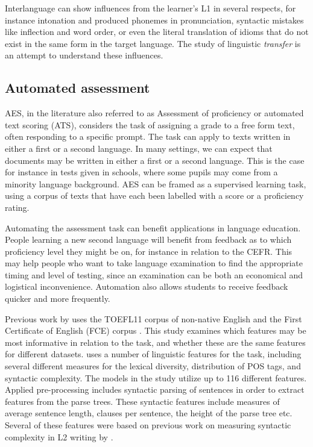 Interlanguage can show influences from the learner's L1 in several respects,
for instance intonation and produced phonemes in pronunciation, syntactic
mistakes like inflection and word order, or even the literal translation of
idioms that do not exist in the same form in the target language. The study
of linguistic \emph{transfer} is an attempt to understand these influences.


\subsection{Automated assessment}

\acf{AES}, in the literature also referred to as Assessment of proficiency or
automated text scoring (ATS), considers the task of assigning a grade to a
free form text, often responding to a specific prompt. The task can apply to
texts written in either a first or a second language. In many settings, we
can expect that documents may be written in either a first or a second
language. This is the case for instance in tests given in schools, where some
pupils may come from a minority language background. \ac{AES} can be framed
as a supervised learning task, using a corpus of texts that have each been
labelled with a score or a proficiency rating.

Automating the assessment task can benefit applications in language
education. People learning a new second language will benefit from feedback
as to which proficiency level they might be on, for instance in relation to
the \ac{CEFR}. This may help people who want to take language
examination to find the appropriate timing and level of testing, since an
examination can be both an economical and logistical inconvenience.
Automation also allows students to receive feedback quicker and more
frequently.

Previous work by \textcite{vajjala17} uses the TOEFL11 corpus of non-native
English \autocite{blanchard13} and the First Certificate of English (FCE)
corpus \autocite{yannakoudakis2011new}. This study examines which features
may be most informative in relation to the task, and whether these are the
same features for different datasets. \citeauthor{vajjala17} uses a number of
linguistic features for the task, including several different measures for
the lexical diversity, distribution of \ac{POS} tags, and
syntactic complexity. The models in the study utilize up to 116 different
features. Applied pre-processing includes syntactic parsing of sentences in
order to extract features from the parse trees. These syntactic features
include measures of average sentence length, clauses per sentence, the height
of the parse tree etc. Several of these features were based on previous work
on measuring syntactic complexity in L2 writing by
\textcite{lu2010automatic}.


